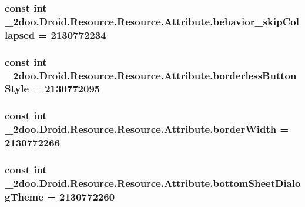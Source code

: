 \hypertarget{class__2doo_1_1_droid_1_1_resource_1_1_attribute_54b08da3775f61a2e300f179804f64c9}{
\subsubsection[{behavior\_\-skipCollapsed}]{\setlength{\rightskip}{0pt plus 5cm}const int \_\-2doo.Droid.Resource.Resource.Attribute.behavior\_\-skipCollapsed = 2130772234}}
\label{class__2doo_1_1_droid_1_1_resource_1_1_attribute_54b08da3775f61a2e300f179804f64c9}


\hypertarget{class__2doo_1_1_droid_1_1_resource_1_1_attribute_2bf11357e703438f597e6095d56d7cf4}{
\subsubsection[{borderlessButtonStyle}]{\setlength{\rightskip}{0pt plus 5cm}const int \_\-2doo.Droid.Resource.Resource.Attribute.borderlessButtonStyle = 2130772095}}
\label{class__2doo_1_1_droid_1_1_resource_1_1_attribute_2bf11357e703438f597e6095d56d7cf4}


\hypertarget{class__2doo_1_1_droid_1_1_resource_1_1_attribute_e5c97187a23faf05cf4d6fa01236d6cb}{
\subsubsection[{borderWidth}]{\setlength{\rightskip}{0pt plus 5cm}const int \_\-2doo.Droid.Resource.Resource.Attribute.borderWidth = 2130772266}}
\label{class__2doo_1_1_droid_1_1_resource_1_1_attribute_e5c97187a23faf05cf4d6fa01236d6cb}


\hypertarget{class__2doo_1_1_droid_1_1_resource_1_1_attribute_26a0b24e93163f95a074204be7b3cbfb}{
\subsubsection[{bottomSheetDialogTheme}]{\setlength{\rightskip}{0pt plus 5cm}const int \_\-2doo.Droid.Resource.Resource.Attribute.bottomSheetDialogTheme = 2130772260}}
\label{class__2doo_1_1_droid_1_1_resource_1_1_attribute_26a0b24e93163f95a074204be7b3cbfb}


